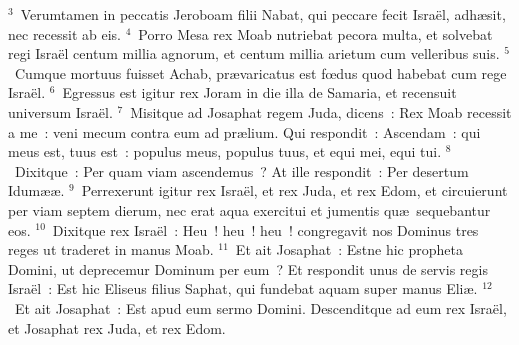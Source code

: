 ${}^{3}$~Verumtamen in peccatis Jeroboam filii Nabat, qui peccare fecit Isra\"el, adh\ae sit, nec recessit ab eis.
${}^{4}$~Porro Mesa rex Moab nutriebat pecora multa, et solvebat regi Isra\"el centum millia agnorum, et centum millia arietum cum velleribus suis.
${}^{5}$~Cumque mortuus fuisset Achab, pr\ae varicatus est fœdus quod habebat cum rege Isra\"el.
${}^{6}$~Egressus est igitur rex Joram in die illa de Samaria, et recensuit universum Isra\"el.
${}^{7}$~Misitque ad Josaphat regem Juda, dicens~: Rex Moab recessit a me~: veni mecum contra eum ad pr\ae lium. Qui respondit~: Ascendam~: qui meus est, tuus est~: populus meus, populus tuus, et equi mei, equi tui.
${}^{8}$~Dixitque~: Per quam viam ascendemus~? At ille respondit~: Per desertum Idum\ae \ae .
${}^{9}$~Perrexerunt igitur rex Isra\"el, et rex Juda, et rex Edom, et circuierunt per viam septem dierum, nec erat aqua exercitui et jumentis qu\ae\ sequebantur eos.
${}^{10}$~Dixitque rex Isra\"el~: Heu~! heu~! heu~! congregavit nos Dominus tres reges ut traderet in manus Moab.
${}^{11}$~Et ait Josaphat~: Estne hic propheta Domini, ut deprecemur Dominum per eum~? Et respondit unus de servis regis Isra\"el~: Est hic Eliseus filius Saphat, qui fundebat aquam super manus Eli\ae .
${}^{12}$~Et ait Josaphat~: Est apud eum sermo Domini. Descenditque ad eum rex Isra\"el, et Josaphat rex Juda, et rex Edom.


